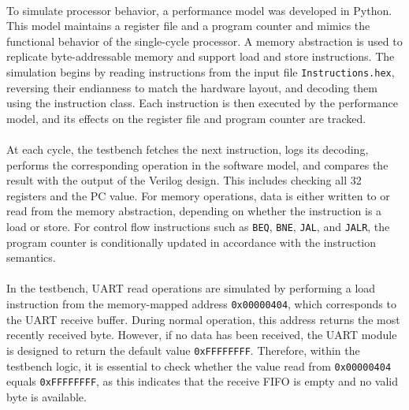 \documentclass[12pt]{report}
\begin{document}
\paragraph{}
To simulate processor behavior, a performance model was developed in Python. This model maintains a register file and a program counter and mimics the functional behavior of the single-cycle processor. A memory abstraction is used to replicate byte-addressable memory and support load and store instructions. The simulation begins by reading instructions from the input file \texttt{Instructions.hex}, reversing their endianness to match the hardware layout, and decoding them using the instruction class. Each instruction is then executed by the performance model, and its effects on the register file and program counter are tracked.

\paragraph{}
At each cycle, the testbench fetches the next instruction, logs its decoding, performs the corresponding operation in the software model, and compares the result with the output of the Verilog design. This includes checking all 32 registers and the PC value. For memory operations, data is either written to or read from the memory abstraction, depending on whether the instruction is a load or store. For control flow instructions such as \texttt{BEQ}, \texttt{BNE}, \texttt{JAL}, and \texttt{JALR}, the program counter is conditionally updated in accordance with the instruction semantics.

 \paragraph{}
In the testbench, UART read operations are simulated by performing a load instruction from the memory-mapped address \texttt{0x00000404}, which corresponds to the UART receive buffer. During normal operation, this address returns the most recently received byte. However, if no data has been received, the UART module is designed to return the default value \texttt{0xFFFFFFFF}. Therefore, within the testbench logic, it is essential to check whether the value read from \texttt{0x00000404} equals \texttt{0xFFFFFFFF}, as this indicates that the receive FIFO is empty and no valid byte is available.
\end{document}
